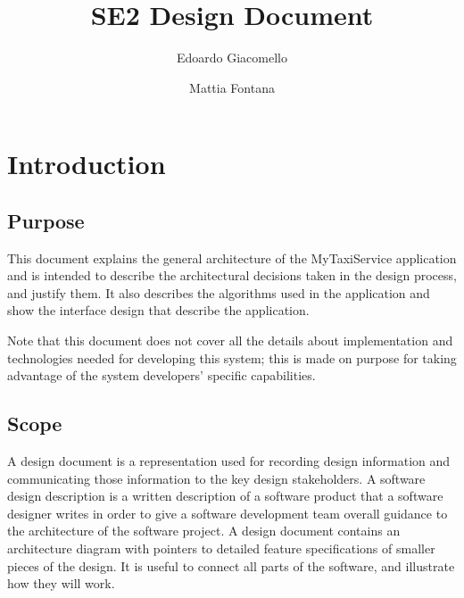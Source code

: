 \documentclass[11pt, a4paper,titlepage]{article}
\author{Edoardo Giacomello \and Mattia Fontana}
\title{SE2 Design Document}
\newcommand{\productname}{MyTaxiService }
\begin{document}
\maketitle
\tableofcontents
\newpage
\section{Introduction}
\subsection{Purpose}
This document explains the general architecture of the \productname application and is intended to describe the architectural decisions taken in the design process, and justify them.
It also describes the algorithms used in the application and show the interface design that describe the application.

	Note that this document does not cover all the details about implementation and technologies needed for developing this system; this is made on purpose for taking advantage of the system developers' specific capabilities.
\subsection{Scope}	
	A design document is a representation used for recording design information and communicating those information to the key design stakeholders.
	A software design description is a written description of a software product that a software designer writes in order to give a software development team overall guidance to the architecture of the software project. A design document contains an architecture diagram with pointers to detailed feature specifications of smaller pieces of the design. 
	It is useful to connect all parts of the software, and illustrate how they will work.
	 
\end{document}
